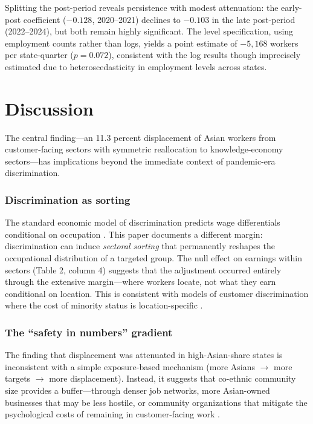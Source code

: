 \documentclass[12pt]{article}
\begin{document}
Splitting the post-period reveals persistence with modest attenuation: the early-post coefficient ($-0.128$, 2020--2021) declines to $-0.103$ in the late post-period (2022--2024), but both remain highly significant. The level specification, using employment counts rather than logs, yields a point estimate of $-5,168$ workers per state-quarter ($p = 0.072$), consistent with the log results though imprecisely estimated due to heteroscedasticity in employment levels across states.

\section{Discussion}

The central finding---an 11.3 percent displacement of Asian workers from customer-facing sectors with symmetric reallocation to knowledge-economy sectors---has implications beyond the immediate context of pandemic-era discrimination.

\subsubsection*{Discrimination as sorting} The standard economic model of discrimination predicts wage differentials conditional on occupation \citep{becker1957}. This paper documents a different margin: discrimination can induce \textit{sectoral sorting} that permanently reshapes the occupational distribution of a targeted group. The null effect on earnings within sectors (Table 2, column 4) suggests that the adjustment occurred entirely through the extensive margin---where workers locate, not what they earn conditional on location. This is consistent with models of customer discrimination where the cost of minority status is location-specific \citep{holzer1998customer}.

\subsubsection*{The ``safety in numbers'' gradient} The finding that displacement was attenuated in high-Asian-share states is inconsistent with a simple exposure-based mechanism (more Asians $\rightarrow$ more targets $\rightarrow$ more displacement). Instead, it suggests that co-ethnic community size provides a buffer---through denser job networks, more Asian-owned businesses that may be less hostile, or community organizations that mitigate the psychological costs of remaining in customer-facing work \citep{munshi2003networks}.
\end{document}
